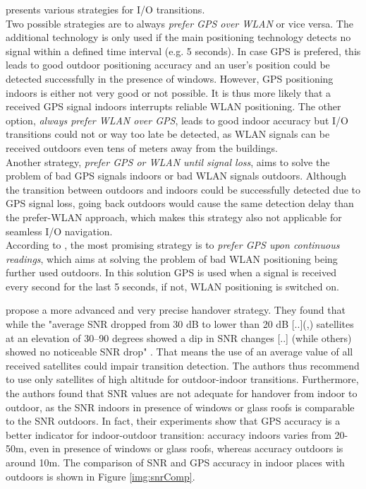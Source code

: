 \cite{streamspin} presents various strategies for I/O transitions.\\
Two possible strategies are to always \textit{prefer GPS over WLAN} or vice versa.
The additional technology is only used if the main positioning technology detects no signal within a defined time interval (e.g. 5 seconds).
In case GPS is prefered, this leads to good outdoor positioning accuracy and an user's position could be detected successfully in the presence of windows. However, GPS positioning indoors is either not very good or not possible. It is thus more likely that a received GPS signal indoors interrupts reliable WLAN positioning. The other option, \textit{always prefer WLAN over GPS}, leads to good indoor accuracy but I/O transitions could not or way too late be detected, as WLAN signals can be received outdoors even tens of meters away from the buildings.\\
Another strategy, \textit{prefer GPS or WLAN until signal loss}, aims to solve the problem of bad GPS signals indoors or bad WLAN signals outdoors. Although the transition between outdoors and indoors could be successfully detected due to GPS signal loss, going back outdoors would cause the same detection delay than the prefer-WLAN approach, which makes this strategy also not applicable for seamless I/O navigation.\\
According to \cite{streamspin}, the most promising strategy is to \textit{prefer GPS upon continuous readings}, which aims at solving the problem of bad WLAN positioning being further used outdoors. In this solution GPS is used when a signal is received every second for the last 5 seconds, if not, WLAN positioning is switched on.

\cite{seamlessGPShandoverStrategy} propose a more advanced and very precise handover strategy. They found that while the "average SNR dropped from 30 dB to lower than 20 dB [..](,) satellites at an elevation of 30–90 degrees showed a dip in SNR changes [..] (while others) showed no noticeable SNR drop" \cite[p. 6]{seamlessGPShandoverStrategy}. That means the use of an average value of all received satellites could impair transition detection. The authors thus recommend to use only satellites of high altitude for outdoor-indoor transitions.
Furthermore, the authors found that SNR values are not adequate for handover from indoor to outdoor, as the SNR indoors in presence of windows or glass roofs is comparable to the SNR outdoors. In fact, their experiments show that GPS accuracy is a better indicator for indoor-outdoor transition: accuracy indoors varies from 20-50m, even in presence of windows or glass roofs, whereas accuracy outdoors is around 10m.
The comparison of SNR and GPS accuracy in indoor places with outdoors is shown in Figure \ref{img:snrComp}.

